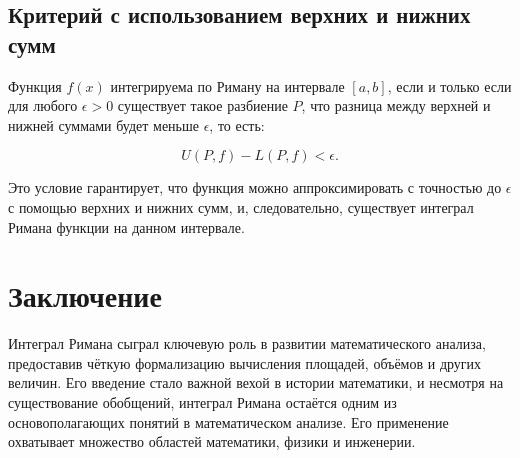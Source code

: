 \subsection{Критерий с использованием верхних и нижних сумм}

Функция \( f(x) \) интегрируема по Риману на интервале \( [a, b] \), если и
только если для любого \( \epsilon > 0 \) существует такое разбиение \( P \),
что разница между верхней и нижней суммами будет меньше \( \epsilon \), то
есть:

\[ U(P, f) - L(P, f) < \epsilon.  \]

Это условие гарантирует, что функция можно аппроксимировать с точностью до \(
\epsilon \) с помощью верхних и нижних сумм, и, следовательно, существует
интеграл Римана функции на данном интервале.

\section{Заключение}

Интеграл Римана сыграл ключевую роль в развитии математического анализа,
предоставив чёткую формализацию вычисления площадей, объёмов и других величин.
Его введение стало важной вехой в истории математики, и несмотря на
существование обобщений, интеграл Римана остаётся
одним из основополагающих понятий в математическом анализе. Его применение
охватывает множество областей математики, физики и инженерии.





